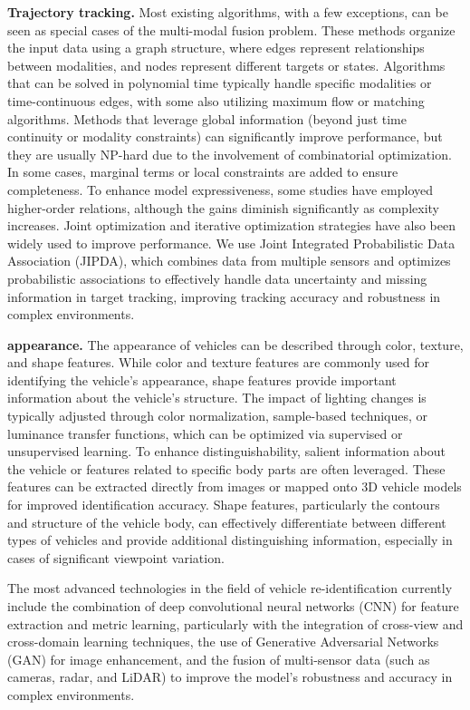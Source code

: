 \textbf{Trajectory tracking.}
Most existing algorithms, with a few exceptions, can be seen as special cases of the multi-modal fusion problem. 
These methods organize the input data using a graph structure, where edges represent relationships between modalities, and nodes represent different targets or states. 
Algorithms that can be solved in polynomial time typically handle specific modalities or time-continuous edges, with some also utilizing maximum flow or matching algorithms. 
Methods that leverage global information (beyond just time continuity or modality constraints) can significantly improve performance, but they are usually NP-hard due to the involvement of combinatorial optimization. 
In some cases, marginal terms or local constraints are added to ensure completeness. 
To enhance model expressiveness, some studies have employed higher-order relations, although the gains diminish significantly as complexity increases. 
Joint optimization and iterative optimization strategies have also been widely used to improve performance.
We use Joint Integrated Probabilistic Data Association (JIPDA), which combines data from multiple sensors and optimizes probabilistic associations to effectively handle data uncertainty and missing information in target tracking, improving tracking accuracy and robustness in complex environments.


\textbf{appearance.}
The appearance of vehicles can be described through color, texture, and shape features. 
While color and texture features are commonly used for identifying the vehicle's appearance, shape features provide important information about the vehicle's structure. 
The impact of lighting changes is typically adjusted through color normalization, sample-based techniques, or luminance transfer functions, which can be optimized via supervised or unsupervised learning. 
To enhance distinguishability, salient information about the vehicle or features related to specific body parts are often leveraged. 
These features can be extracted directly from images or mapped onto 3D vehicle models for improved identification accuracy. 
Shape features, particularly the contours and structure of the vehicle body, can effectively differentiate between different types of vehicles and provide additional distinguishing information, especially in cases of significant viewpoint variation.

The most advanced technologies in the field of vehicle re-identification currently include the combination of deep convolutional neural networks (CNN) for feature extraction and metric learning, particularly with the integration of cross-view and cross-domain learning techniques, the use of Generative Adversarial Networks (GAN) for image enhancement, and the fusion of multi-sensor data (such as cameras, radar, and LiDAR) to improve the model's robustness and accuracy in complex environments.

